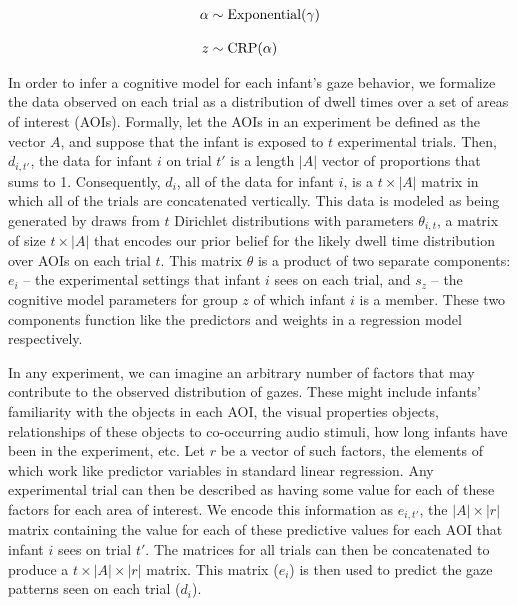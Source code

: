 \documentclass[12pt]{article}
\begin{document}
\begin{equation}\label{eq:crp}
\setlength{\jot}{12pt}
\begin{aligned} 
\alpha &\sim \text{Exponential}(\gamma)\\
z &\sim \text{CRP}(\alpha)
\end{aligned}
\end{equation}

	In order to infer a cognitive model for each infant's gaze behavior, we formalize the data observed on each trial as a distribution of dwell times over a set of areas of interest (AOIs). Formally, let the AOIs in an experiment be defined as the vector $A$, and suppose that the infant is exposed to $t$ experimental trials. Then, $d_{i,t'}$, the data for infant $i$ on trial $t'$ is a length $|A|$ vector of proportions that sums to 1. Consequently, $d_{i}$, all of the data for infant $i$, is a $t \times |A|$ matrix in which all of the trials are concatenated vertically. This data is modeled as being generated by draws from $t$ Dirichlet distributions with parameters $\theta_{i,t}$, a matrix of size $t \times |A|$ that encodes our prior belief for the likely dwell time distribution over AOIs on each trial $t$. This matrix $\theta$  is a product of two separate components: $e_{i}$ -- the experimental settings that infant $i$ sees on each trial, and $s_{z}$ -- the cognitive model parameters for group $z$ of which infant $i$  is a member. These two components function like the predictors and weights in a regression model respectively.

	In any experiment, we can imagine an arbitrary number of factors that may contribute to the observed distribution of gazes. These might include infants' familiarity with the objects in each AOI, the visual properties objects, relationships of these objects to co-occurring audio stimuli, how long infants have been in the experiment, etc. Let $r$ be a vector of such factors, the elements of which work like predictor variables in standard linear regression. Any experimental trial can then be described as having some value for each of these factors for each area of interest. We encode this information as $e_{i,t'}$, the $|A| \times |r|$ matrix containing the value for each of these predictive values for each AOI that infant $i$ sees on trial $t'$. The matrices for all trials can then be concatenated to produce a $t \times |A| \times |r|$ matrix. This matrix ($e_{i}$) is then used to predict the gaze patterns seen on each trial ($d_{i}$). 
\end{document}

